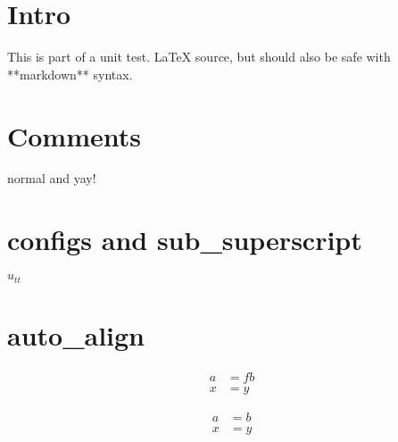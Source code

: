 \documentclass[12pt]{article}
\begin{document}
\section{Intro}
This is part of a unit test. \LaTeX{} source, but should also be safe with **markdown** syntax.

\section{Comments}
normal %
and
yay!

\section{configs and sub_superscript}
$u_{tt}$

\section{auto_align}
\begin {align}
a &= fb \\
x &= y
\end{align}

\begin {align}
a &= b \\

x &= y
\end{align}
\end{document}
